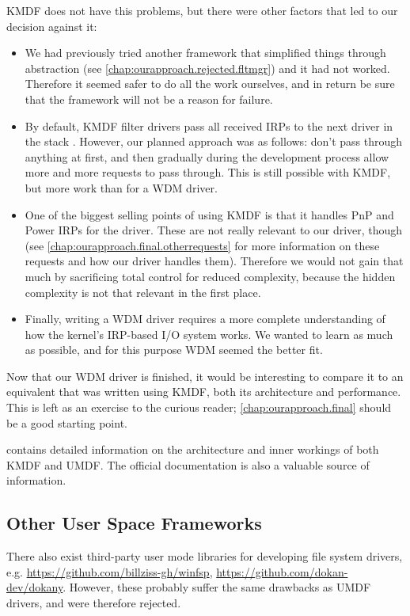 KMDF does not have this problems, but there were other factors that led to our decision against it:
\begin{itemize}
	\item We had previously tried another framework that simplified things through abstraction (see \autoref{chap:ourapproach.rejected.fltmgr}) and it had not worked. Therefore it seemed safer to do all the work ourselves, and in return be sure that the framework will not be a reason for failure.
	\item By default, KMDF filter drivers pass all received IRPs to the next driver in the stack \cite{Wdf}. However, our planned approach was as follows: don't pass through anything at first, and then gradually during the development process allow more and more requests to pass through. This is still possible with KMDF, but more work than for a WDM driver.
	\item One of the biggest selling points of using KMDF is that it handles PnP and Power IRPs for the driver. These are not really relevant to our driver, though (see \autoref{chap:ourapproach.final.otherrequests} for more information on these requests and how our driver handles them). Therefore we would not gain that much by sacrificing total control for reduced complexity, because the hidden complexity is not that relevant in the first place.
	\item Finally, writing a WDM driver requires a more complete understanding of how the kernel's IRP-based I/O system works. We wanted to learn as much as possible, and for this purpose WDM seemed the better fit.
\end{itemize}

Now that our WDM driver is finished, it would be interesting to compare it to an equivalent that was written using KMDF, both its architecture and performance. This is left as an exercise to the curious reader; \autoref{chap:ourapproach.final} should be a good starting point.

\cite{Yosifovich2017} contains detailed information on the architecture and inner workings of both KMDF and UMDF. The official documentation \cite{Wdf} is also a valuable source of information.

\subsection{Other User Space Frameworks}
\label{chap:ourapproach.rejected.other}
There also exist third-party user mode libraries for developing file system drivers, e.g. \url{https://github.com/billziss-gh/winfsp}, \url{https://github.com/dokan-dev/dokany}. However, these probably suffer the same drawbacks as UMDF drivers, and were therefore rejected.

